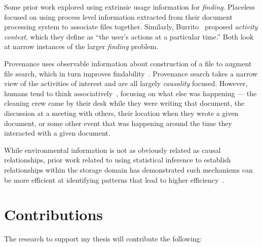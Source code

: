 Some prior work explored using extrinsic usage information for \emph{finding}.
Placeless~\cite{placeless-tois} focused on using process level information extracted from their document processing
system to associate files together. Similarly,
Burrito~\cite{guo2012burrito} proposed \emph{activity context}, which they define as ``the
user's actions at a particular time.'' Both look at narrow instances of the
larger \emph{finding} problem.

Provenance uses observable information about construction of a file to augment file
search, which in turn improves findability~\cite{provsearch}. Provenance search
takes a narrow view of the activities of interest and are all largely
\emph{causality} focused.  However, humans tend to think
associatively~\cite{10.1145/1559845.1559992}, focusing on what else was
happening --- the cleaning crew came by their desk while they were writing that
document, the discussion at a meeting with others, their location when they
wrote a given document, or some other event that was happening around the time
they interacted with a given document.

While environmental information is not as obviously related as causal
relationships, prior work related to using statistical inference to establish
relationships within the storage domain has demonstrated such mechanisms can be
more efficient at identifying patterns that lead to higher
efficiency~\cite{10.1145/3035918.3064029}.

\section{Contributions}
\label{ch:intro:sec:contributions}

The research to support my thesis will contribute the following:


